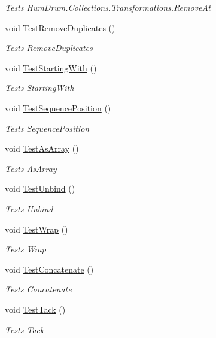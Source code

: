 \begin{DoxyCompactItemize}
\begin{DoxyCompactList}\small\item\em Tests Hum\+Drum.\+Collections.\+Transformations.\+Remove\+At \end{DoxyCompactList}\item 
void \hyperlink{classHumDrumTests_1_1Collections_1_1Transformations_a88c25eb69e875e4cb68a0a0584eabae7}{Test\+Remove\+Duplicates} ()
\begin{DoxyCompactList}\small\item\em Tests Remove\+Duplicates \end{DoxyCompactList}\item 
void \hyperlink{classHumDrumTests_1_1Collections_1_1Transformations_aa41e03421870509db7ee63c0a5131ab6}{Test\+Starting\+With} ()
\begin{DoxyCompactList}\small\item\em Tests Starting\+With \end{DoxyCompactList}\item 
void \hyperlink{classHumDrumTests_1_1Collections_1_1Transformations_adab5f73fb3ec8bce36dcefc5d8b97998}{Test\+Sequence\+Position} ()
\begin{DoxyCompactList}\small\item\em Tests Sequence\+Position \end{DoxyCompactList}\item 
void \hyperlink{classHumDrumTests_1_1Collections_1_1Transformations_a61cd9f7daa4a6c05fa377934ba58a5b3}{Test\+As\+Array} ()
\begin{DoxyCompactList}\small\item\em Tests As\+Array \end{DoxyCompactList}\item 
void \hyperlink{classHumDrumTests_1_1Collections_1_1Transformations_a64cbce1f3df4d14fefcbfb673f0c504b}{Test\+Unbind} ()
\begin{DoxyCompactList}\small\item\em Tests Unbind \end{DoxyCompactList}\item 
void \hyperlink{classHumDrumTests_1_1Collections_1_1Transformations_a62fb4f02910e19d891529377fd60a487}{Test\+Wrap} ()
\begin{DoxyCompactList}\small\item\em Tests Wrap \end{DoxyCompactList}\item 
void \hyperlink{classHumDrumTests_1_1Collections_1_1Transformations_a20313eaff7eb859a872280621964fffb}{Test\+Concatenate} ()
\begin{DoxyCompactList}\small\item\em Tests Concatenate \end{DoxyCompactList}\item 
void \hyperlink{classHumDrumTests_1_1Collections_1_1Transformations_a1e80b410776c7e2d85afc098fcde4e08}{Test\+Tack} ()
\begin{DoxyCompactList}\small\item\em Tests Tack \end{DoxyCompactList}\end{DoxyCompactItemize}


